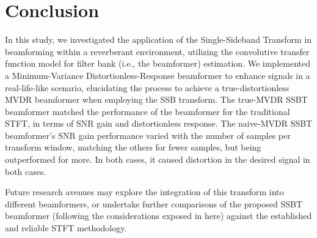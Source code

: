 \section{Conclusion}
\label{sec:conclusion}

In this study, we investigated the application of the Single-Sideband Transform in beamforming within a reverberant environment, utilizing the convolutive transfer function model for filter bank (i.e., the beamformer) estimation. We implemented a Minimum-Variance Distortionless-Response beamformer to enhance signals in a real-life-like scenario, elucidating the process to achieve a true-distortionless MVDR beamformer when employing the SSB transform. The true-MVDR SSBT beamformer matched the performance of the beamformer for the traditional STFT, in terms of SNR gain and distortionless response. The naive-MVDR SSBT beamformer's SNR gain performance varied with the number of samples per transform window, matching the others for fewer samples, but being outperformed for more. In both cases, it caused distortion in the desired signal in both cases.

Future research avenues may explore the integration of this transform into different beamformers, or undertake further comparisons of the proposed SSBT beamformer (following the considerations exposed in here) against the established and reliable STFT methodology.